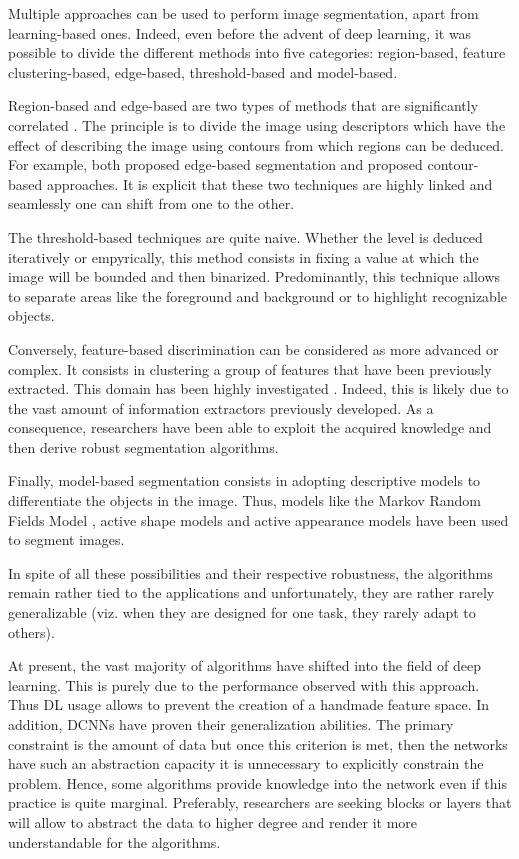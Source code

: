 Multiple approaches can be used to perform image segmentation, apart from learning-based ones. Indeed, even before the advent of deep learning, it was possible to divide the different methods into five categories: region-based, feature clustering-based, edge-based, threshold-based and model-based.

Region-based and edge-based are two types of methods that are significantly correlated \cite{kaganami2009region,chu1990integration}. The principle is to divide the image using descriptors which have the effect of describing the image using contours from which regions can be deduced. For example, \cite{iannizzotto2000fast, sappa2006unsupervised} both proposed edge-based segmentation and \cite{wani1994edge, mukherjee2014region} proposed contour-based approaches. It is explicit that these two techniques are highly linked and seamlessly one can shift from one to the other.


The threshold-based techniques \cite{bhargavi2014survey} are quite naive. Whether the level is deduced iteratively or empyrically, this method consists in fixing a value at which the image will be bounded and then binarized. Predominantly, this technique allows to separate areas like the foreground and background or to highlight recognizable objects.


Conversely, feature-based discrimination can be considered as more advanced or complex. It consists in clustering a group of features that have been previously extracted. This domain has been highly investigated \cite{watt1986feature,li2006new,rashedi2013stochastic}. Indeed, this is likely due to the vast amount of information extractors previously developed. As a consequence, researchers have been able to exploit the acquired knowledge and then derive robust segmentation algorithms.


Finally, model-based segmentation consists in adopting descriptive models to differentiate the objects in the image. Thus, models like the Markov Random Fields Model \cite{marroquin2003hidden}, active shape models \cite{van2002active} and active appearance models have been used to segment images\cite{cootes2001active}.


In spite of all these possibilities and their respective robustness, the algorithms remain rather tied to the applications and unfortunately, they are rather rarely generalizable (viz. when they are designed for one task, they rarely adapt to others).


At present, the vast majority of algorithms have shifted into the field of deep learning. This is purely due to the performance observed with this approach. Thus DL usage allows to prevent the creation of a handmade feature space. In addition, DCNNs have proven their generalization abilities. The primary constraint is the amount of data but once this criterion is met, then the networks have such an abstraction capacity it is unnecessary to explicitly constrain the problem. Hence, some algorithms provide knowledge into the network even if this practice is quite marginal. Preferably, researchers are seeking blocks or layers that will allow to abstract the data to higher degree and render it more understandable for the algorithms. 


